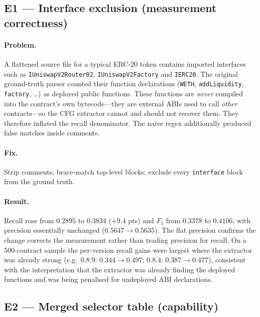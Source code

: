 \documentclass[10pt,conference]{article}
\begin{document}
\subsection{E1 --- Interface exclusion (measurement correctness)}
\label{sec:e1}

\paragraph{Problem.}
A flattened source file for a typical ERC-20 token contains imported interfaces
such as \texttt{IUniswapV2Router02}, \texttt{IUniswapV2Factory} and
\texttt{IERC20}. The original ground-truth parser counted their function
declarations (\texttt{WETH}, \texttt{addLiquidity}, \texttt{factory}, \dots) as
deployed public functions. These functions are \emph{never} compiled into the
contract's own bytecode---they are external ABIs used to call \emph{other}
contracts---so the CFG extractor cannot and should not recover them. They
therefore inflated the recall denominator. The naive regex additionally produced
false matches inside comments.

\paragraph{Fix.}
Strip comments; brace-match top-level blocks; exclude every
\texttt{interface} block from the ground truth.

\paragraph{Result.}
Recall rose from $0.2895$ to $0.3834$ ($+9.4$ pts) and $F_1$ from $0.3378$ to
$0.4106$, with precision essentially unchanged ($0.5647\rightarrow0.5635$). The
flat precision confirms the change corrects the measurement rather than trading
precision for recall. On a 500-contract sample the per-version recall gains were
largest where the extractor was already strong (e.g.\ 0.8.9: $0.344\rightarrow
0.497$; 0.8.4: $0.387\rightarrow0.477$), consistent with the interpretation that
the extractor was already finding the deployed functions and was being penalised
for undeployed ABI declarations.

\subsection{E2 --- Merged selector table (capability)}
\label{sec:e2}
\end{document}
